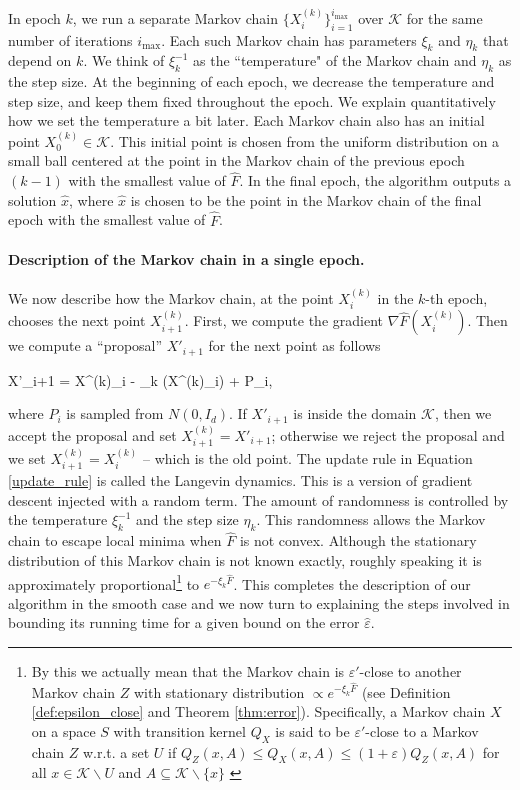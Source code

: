 \documentclass[final,12pt]{colt2018} %
\renewcommand{\epsilon}{\varepsilon}
\def \be{\begin{equs}}
\def \ee{\end{equs}}
\begin{document}
{ In epoch $k$, we run a separate Markov chain $\{X_i^{(k)}\}_{i=1}^{{i_{\textrm{max}}}}$ over $\mathcal{K}$  
 for the same number of iterations $i_{\textrm{max}}$.
 Each such Markov chain has parameters $\xi_k$ and $\eta_k$ that depend on $k$.  
 We think of $\xi_k^{-1}$ as the ``temperature" of the Markov chain and $\eta_k$ as the step size.  
 At the beginning of each epoch,  we decrease the temperature and step size, and keep them fixed throughout the epoch.
We explain quantitatively how we set the temperature a bit later. 
%
Each Markov chain also has an initial point $X_0^{(k)} \in \mathcal{K}$.  
% 
This initial point is chosen from the uniform distribution on a small ball  centered at the point in the Markov chain of the previous epoch $(k-1)$ with the smallest value of $\hat{F}$.
%
In the final epoch, the algorithm outputs a solution $\hat{x}$, where $\hat{x}$ is chosen to be the point in the Markov chain of the final epoch with the smallest value of $\hat{F}$.
%

\paragraph{Description of the Markov chain in a single epoch.}
We now describe how the Markov chain,  at the point $X_i^{(k)}$ in the $k$-th epoch, chooses the next point $X_{i+1}^{(k)}$. 
%
 First, we compute the gradient $\nabla \hat{F}(X_i^{(k)})$.  
 Then we compute a ``proposal'' $X'_{i+1}$ for the next point as follows
\be \label{update_rule}
X'_{i+1} = X^{(k)}_i - \eta_k \nabla {}(X^{(k)}_i) +  P_i,
\ee
where $P_i$ is sampled from $N(0,I_d)$.
%
 If $X'_{i+1}$ is inside the domain $\mathcal{K}$, then we accept the proposal and set $X^{(k)}_{i+1} = X'_{i+1}$; otherwise we reject the proposal and we set $X^{(k)}_{i+1} = X^{(k)}_i$ -- which is the old point.  
 The update rule in Equation \eqref{update_rule} is called the Langevin dynamics.  
 This is a version of gradient descent injected with a random term.  
 The amount of randomness is controlled by the temperature $\xi_k^{-1}$ and the step size $\eta_k$.
 This randomness allows the Markov chain to escape local minima when $\hat{F}$ is not convex. 
  Although the stationary distribution of this Markov chain is not known exactly, roughly speaking it is approximately proportional\footnote{{By this we actually mean that the Markov chain is $\epsilon'$-close to another Markov chain $Z$ with stationary distribution $\propto e^{-\xi_k \hat{F}}$ (see Definition \ref{def:epsilon_close} and  Theorem \ref{thm:error}). Specifically, a Markov chain $X$ on a space $S$ with transition kernel $Q_X$ is said to be $\epsilon'$-close to a Markov chain $Z$ w.r.t. a set $U$ if $Q_Z(x,A) \leq  Q_X(x,A) \leq (1+\epsilon)Q_Z(x,A)$ for all $x \in \mathcal{K} \backslash U$ and $A \subseteq \mathcal{K} \backslash\{x\}$ \citep{hitting_times}}} to  $e^{-\xi_k \hat{F}}$. %
 This completes the description of our algorithm in the smooth case and we now turn to explaining the steps involved in bounding its running time for a given bound on the error $\hat{\varepsilon}$.

}
\end{document}
